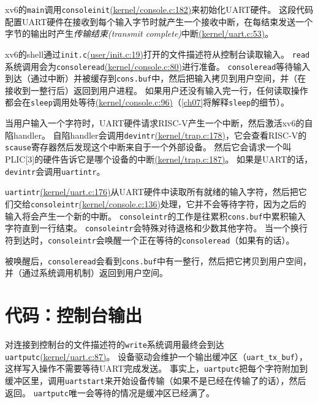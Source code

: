 xv6的\texttt{main}调用\texttt{consoleinit}\href{https://github.com/mit-pdos/xv6-riscv/blob/risc/kernel/console.c#L182}{(kernel/console.c:182)}来初始化UART硬件。
这段代码配置UART硬件在接收到每个输入字节时就产生一个接收中断，在每结束发送一个字节的输出时产生\emph{传输结束(transmit complete)}中断\href{https://github.com/mit-pdos/xv6-riscv/blob/risc/kernel/uart.c#L53}{(kernel/uart.c:53)}。

xv6的shell通过\texttt{init.c}\href{https://github.com/mit-pdos/xv6-riscv/blob/risc/user/init.c#L19}{(user/init.c:19)}打开的文件描述符从控制台读取输入。
\texttt{read}系统调用会为\texttt{consoleread}\href{https://github.com/mit-pdos/xv6-riscv/blob/risc/kernel/console.c#L80}{(kernel/console.c:80)}进行准备。
\texttt{consoleread}等待输入到达（通过中断）并被缓存到\texttt{cons.buf}中，然后把输入拷贝到用户空间，并（在接收到一整行后）返回到用户进程。
如果用户还没有输入完一行，任何读取操作都会在\texttt{sleep}调用处等待\href{https://github.com/mit-pdos/xv6-riscv/blob/risc/kernel/console.c#L96}{(kernel/console.c:96)}（\autoref{ch07}将解释\texttt{sleep}的细节）。

当用户输入一个字符时，UART硬件请求RISC-V产生一个中断，然后激活xv6的自陷handler。
自陷handler会调用\texttt{devintr}\href{https://github.com/mit-pdos/xv6-riscv/blob/risc/kernel/trap.c#L178}{(kernel/trap.c:178)}，它会查看RISC-V的\texttt{scause}寄存器然后发现这个中断来自于一个外部设备。
然后它会请求一个叫PLIC[3]的硬件告诉它是哪个设备的中断\href{https://github.com/mit-pdos/xv6-riscv/blob/risc/kernel/trap.c#L187}{(kernel/trap.c:187)}。
如果是UART的话，\texttt{devintr}会调用\texttt{uartintr}。

\texttt{uartintr}\href{https://github.com/mit-pdos/xv6-riscv/blob/risc/kernel/uart.c#L176}{(kernel/uart.c:176)}从UART硬件中读取所有就绪的输入字符，然后把它们交给\texttt{consoleintr}\href{https://github.com/mit-pdos/xv6-riscv/blob/risc/kernel/console.c#L136}{(kernel/console.c:136)}处理，它并不会等待字符，因为之后的输入将会产生一个新的中断。
\texttt{consoleintr}的工作是往累积\texttt{cons.buf}中累积输入字符直到一行结束。
\texttt{consoleintr}会特殊对待退格和少数其他字符。
当一个换行符到达时，\texttt{consoleintr}会唤醒一个正在等待的\texttt{consoleread}（如果有的话）。

被唤醒后，\texttt{consoleread}会看到\texttt{cons.buf}中有一整行，然后把它拷贝到用户空间，并（通过系统调用机制）返回到用户空间。

\section{代码：控制台输出}
对连接到控制台的文件描述符的\texttt{write}系统调用最终会到达\texttt{uartputc}\href{https://github.com/mit-pdos/xv6-riscv/blob/risc/kernel/uart.c#L87}{(kernel/uart.c:87)}。
设备驱动会维护一个输出缓冲区（\texttt{uart\_tx\_buf}），这样写入操作不需要等待UART完成发送。
事实上，\texttt{uartputc}把每个字符附加到缓冲区里，调用\texttt{uartstart}来开始设备传输（如果不是已经在传输了的话），然后返回。
\texttt{uartputc}唯一会等待的情况是缓冲区已经满了。

